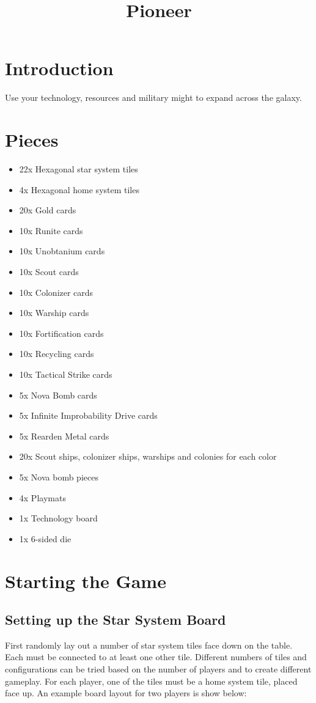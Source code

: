 \documentclass[12pt]{article} %
\date{}
\begin{document}
\title{Pioneer}
\maketitle

\section{Introduction}

Use your technology, resources and military might to expand across the galaxy.

\section{Pieces}

\begin{itemize}
	\item 22x Hexagonal star system tiles
	\item 4x Hexagonal home system tiles
	\item 20x Gold cards
	\item 10x Runite cards
	\item 10x Unobtanium cards
	\item 10x Scout cards
	\item 10x Colonizer cards
	\item 10x Warship cards
	\item 10x Fortification cards
	\item 10x Recycling cards
	\item 10x Tactical Strike cards
	\item 5x Nova Bomb cards
	\item 5x Infinite Improbability Drive cards
	\item 5x Rearden Metal cards
	\item 20x Scout ships, colonizer ships, warships and colonies for each color
	\item 5x Nova bomb pieces
	\item 4x Playmats
	\item 1x Technology board
	\item 1x 6-sided die
\end{itemize}

\section{Starting the Game}

\subsection{Setting up the Star System Board}
First randomly lay out a number of star system tiles face down on the table.  Each must be connected to at least one other tile.  Different numbers of tiles and configurations can be tried based on the number of players and to create different gameplay.  For each player, one of the tiles must be a home system tile, placed face up.  An example board layout for two players is show below:
\end{document}
